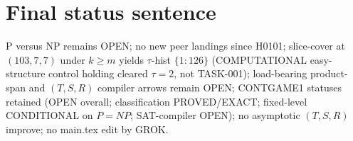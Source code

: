 \documentclass[11pt]{article}
\begin{document}
\section*{Final status sentence}
P versus NP remains OPEN; no new peer landings since H0101; slice-cover at $(103,7,7)$ under
$k{\ge}m$ yields $\tau$-hist $\{1{:}126\}$ (COMPUTATIONAL easy-structure control holding
cleared $\tau{=}2$, not TASK-001); load-bearing product-span and $(T,S,R)$ compiler arrows remain OPEN;
CONTGAME1 statuses retained (OPEN overall; classification PROVED/EXACT; fixed-level CONDITIONAL on $P{=}NP$;
SAT-compiler OPEN); no asymptotic $(T,S,R)$ improve; no main.tex edit by GROK.
\end{document}
